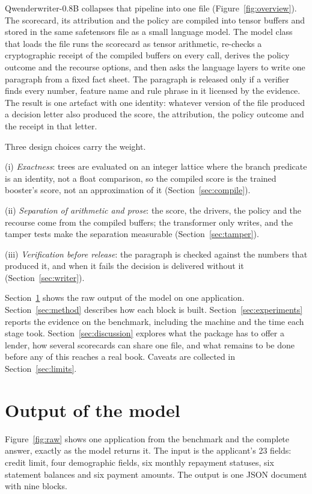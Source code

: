\documentclass[twocolumn,10pt]{article}
\newcommand{\QW}{Qwenderwriter-0.8B}
\begin{document}
\QW{} collapses that pipeline into one file (Figure~\ref{fig:overview}). The scorecard, its attribution and the policy are compiled into tensor
buffers and stored in the same safetensors file as a small language model. The model class that loads the file runs the
scorecard as tensor arithmetic, re-checks a cryptographic receipt of the compiled buffers on every call, derives the
policy outcome and the recourse options, and then asks the language layers to write one paragraph from a fixed fact
sheet. The paragraph is released only if a verifier finds every number, feature name and rule phrase in it licensed by the
evidence. The result is one artefact with one identity: whatever version of the file produced a decision letter also produced the
score, the attribution, the policy outcome and the receipt in that letter.

Three design choices carry the weight.

\noindent (i) \emph{Exactness}: trees are evaluated on an integer lattice where the branch
predicate is an identity, not a float comparison, so the compiled score is the trained booster's score, not an
approximation of it (Section~\ref{sec:compile}).

\noindent (ii) \emph{Separation of arithmetic and prose}: the score, the drivers, the
policy and the recourse come from the compiled buffers; the transformer only writes, and the tamper tests make the
separation measurable (Section~\ref{sec:tamper}).

\noindent (iii) \emph{Verification before release}: the paragraph is checked against the
numbers that produced it, and when it fails the decision is delivered without it (Section~\ref{sec:writer}).

Section~\ref{sec:output} shows the raw output of the model on one application. Section~\ref{sec:method} describes how
each block is built. Section~\ref{sec:experiments} reports the evidence on the benchmark, including the machine and the
time each stage took. Section~\ref{sec:discussion} explores what the package has to offer a lender, how several scorecards can
share one file, and what remains to be done before any of this reaches a real book. Caveats are collected in
Section~\ref{sec:limits}.

\section{Output of the model}
\label{sec:output}

Figure~\ref{fig:raw} shows one application from the benchmark and the complete answer, exactly as the model returns it.
The input is the applicant's 23 fields: credit limit, four demographic fields, six monthly repayment statuses, six
statement balances and six payment amounts. The output is one JSON document with nine blocks.
\end{document}

